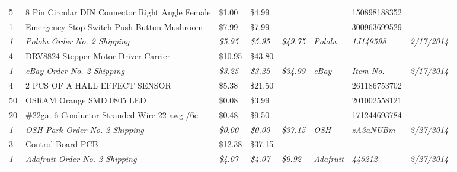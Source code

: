 \begin{table}[h]
{\begin{tabular}{llllllll}
5            & 8 Pin Circular DIN Connector Right Angle Female   & \$1.00           & \$4.99           &                   &                   & 150898188352          &                     \\
1            & Emergency Stop Switch Push Button Mushroom        & \$7.99           & \$7.99           &                   &                   & 300963699529          &                     \\  \hline \hline
\textit{1}   & \textit{Pololu Order No. 2 Shipping}              & \textit{\$5.95}  & \textit{\$5.95}  & \textit{\$49.75}  & \textit{Pololu}   & \textit{1J149598}     & \textit{2/17/2014}  \\
4            & DRV8824 Stepper Motor Driver Carrier              & \$10.95          & \$43.80          &                   &                   &                       &                     \\  \hline \hline
\textit{1}   & \textit{eBay Order No. 2 Shipping}                & \textit{\$3.25}  & \textit{\$3.25}  & \textit{\$34.99}  & \textit{eBay}     & \textit{Item No.}     & \textit{2/17/2014}  \\
4            & 2 PCS OF A HALL EFFECT SENSOR                     & \$5.38           & \$21.50          &                   &                   & 261186753702          &                     \\
50           & OSRAM Orange SMD 0805 LED                         & \$0.08           & \$3.99           &                   &                   & 201002558121          &                     \\
20           & \#22ga. 6 Conductor Stranded Wire 22 awg /6c      & \$0.48           & \$9.50           &                   &                   & 171244693784          &                     \\  \hline \hline
\textit{1}   & \textit{OSH Park Order No. 2 Shipping}            & \textit{\$0.00}  & \textit{\$0.00}  & \textit{\$37.15}  & \textit{OSH}      & \textit{zA3aNUBm}     & \textit{2/27/2014}  \\
3            & Control Board PCB                                 & \$12.38          & \$37.15          &                   &                   &                       &                     \\  \hline \hline
\textit{1}   & \textit{Adafruit Order No. 2 Shipping}            & \textit{\$4.07}  & \textit{\$4.07}  & \textit{\$9.92}   & \textit{Adafruit} & \textit{445212}       & \textit{2/27/2014}  \\

\end{tabular}}
\end{table}
